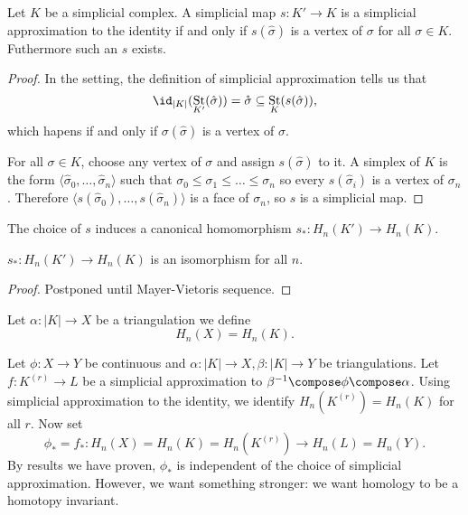 \documentclass[a4paper]{article}
\newcommand{\interior}{\mathring} %
\DeclareMathOperator{\St}{St} %
\begin{document}
\begin{lemma}
  Let \(K\) be a simplicial complex. A simplicial map \(s: K' \to K\) is a simplicial approximation to the identity if and only if \(s(\hat \sigma)\) is a vertex of \(\sigma\) for all \(\sigma \in K\). Futhermore such an \(s\) exists.
\end{lemma}

\begin{proof}
  In the setting, the definition of simplicial approximation tells us that
  \[
    \id_{|K|} (\St_{K'}(\hat \sigma)) = \interior \sigma \subseteq \St_K(s(\hat \sigma)),
  \]
  which hapens if and only if \(\sigma(\hat \sigma)\) is a vertex of \(\sigma\).

  For all \(\sigma \in K\), choose any vertex of \(\sigma\) and assign \(s(\hat \sigma)\) to it. A simplex of \(K\) is the form \(\langle \hat \sigma_0, \dots, \hat \sigma_n \rangle\) such that \(\sigma_0 \leq \sigma_1 \leq \dots \leq \sigma_n\) so every \(s(\hat \sigma_i)\) is a vertex of \(\sigma_n\). Therefore \(\langle s(\hat \sigma_0), \dots, s(\hat \sigma_n) \rangle\) is a face of \(\sigma_n\), so \(s\) is a simplicial map.
\end{proof}

The choice of \(s\) induces a canonical homomorphism \(s_*: H_n(K') \to H_n(K)\).

\begin{proposition}
  \(s_*: H_n(K') \to H_n(K)\) is an isomorphism for all \(n\).
\end{proposition}

\begin{proof}
  Postponed until Mayer-Vietoris sequence.
\end{proof}

\begin{definition}
  Let \(\alpha: |K| \to X\) be a triangulation we define
  \[
    H_n(X) = H_n(K).
  \]
\end{definition}

Let \(\phi: X \to Y\) be continuous and \(\alpha: |K| \to X, \beta: |K| \to Y\) be triangulations. Let \(f: K^{(r)} \to L\) be a simplicial approximation to \(\beta^{-1} \compose \phi \compose \alpha\). Using simplicial approximation to the identity, we identify \(H_n(K^{(r)}) = H_n(K)\) for all \(r\). Now set
\[
  \phi_* = f_*: H_n(X) = H_n(K) = H_n(K^{(r)}) \to H_n(L) = H_n(Y).
\]
By results we have proven, \(\phi_*\) is independent of the choice of simplicial approximation. However, we want something stronger: we want homology to be a homotopy invariant.
\end{document}
